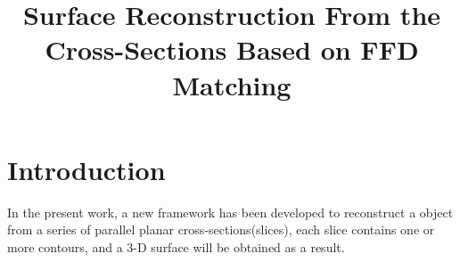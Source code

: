 \documentclass[3p,times]{elsarticle}
\begin{document}
\begin{frontmatter}



\dochead{}

\title{Surface Reconstruction From the Cross-Sections Based on FFD Matching}


\author{}

\address{}

\begin{abstract}
\end{abstract}

\begin{keyword}



\end{keyword}

\end{frontmatter}

\section{Introduction}
\label{section1}
In the present work, a new framework has been developed to
reconstruct a object from a series of parallel planar
cross-sections(slices), each slice contains one or more contours, and
a 3-D surface will be obtained as a result.
\end{document}
